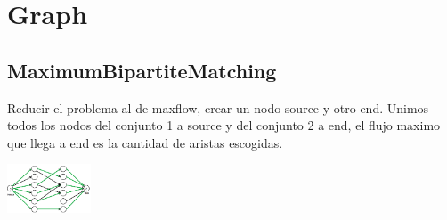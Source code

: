 \chapter{Graph}
\section{MaximumBipartiteMatching}
Reducir el problema al de maxflow, crear un nodo source y otro end. Unimos todos los nodos del conjunto 1 a source y del conjunto 2 a end, el flujo maximo que llega a end es la cantidad de aristas escogidas.
\begin{center}
\includegraphics[width=25mm]{content/graph/maximum_matching.png}
\end{center}
